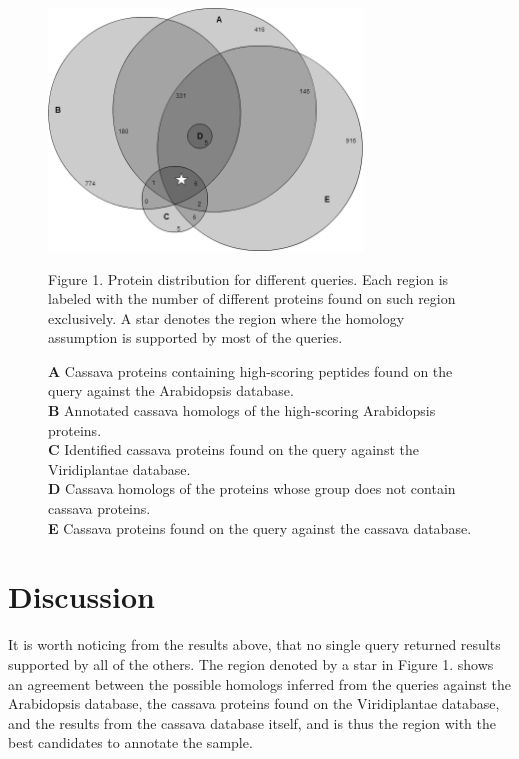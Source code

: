 \documentclass[oneside, a4paper, final]{memoir} %
\newcommand\imglabel[1]{\textbf{\textsf{#1}}}
\begin{document}
	\begin{figure}[h]
{	\centering
	\includegraphics[width=315px]{venn.png}\\}

	\footnotesize Figure 1. Protein distribution for dif{}ferent queries. Each region is labeled with the number of dif{}ferent proteins found on such region exclusively.
	A star denotes the region where the homology assumption is supported by most of the queries.

	\imglabel{A} Cassava proteins containing high-scoring peptides found on the query against the Arabidopsis database.\\
	\imglabel{B} Annotated cassava homologs of the high-scoring Arabidopsis proteins.\\
	\imglabel{C} Identif{}ied cassava proteins found on the query against the Viridiplantae database.\\
	\imglabel{D} Cassava homologs of the proteins whose group does not contain cassava proteins.\\
	\imglabel{E} Cassava proteins found on the query against the cassava database.
	\end{figure}
\section{Discussion}
	It is worth noticing from the results above, that no single query returned results supported by all of the others. The region denoted by a star in Figure 1. shows an agreement
	between the possible homologs inferred from the queries against the Arabidopsis database, the cassava proteins found on the Viridiplantae database, and the results
	from the cassava database itself, and is thus the region with the best candidates to annotate the sample.
\end{document}
